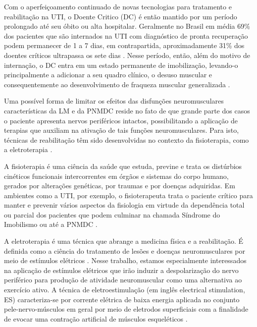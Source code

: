 Com o aperfeiçoamento continuado de novas tecnologias para tratamento e reabilitação na \acrshort{UTI}, o Doente Critico (\acrshort{DC}) é então mantido por um período prolongado até seu óbito ou alta hospitalar.  Geralmente no Brasil em média 69\% dos pacientes que são internados na \acrshort{UTI} com diagnóstico de pronta recuperação podem permanecer de 1 a 7 dias, em contrapartida, aproximadamente 31\% dos doentes críticos ultrapassa os sete dias \cite{Abelha2006FatoresAdultos}. Nesse período, então, além do motivo de internação, o \acrshort{DC} entra em um estado permanente de imobilização, levando-o principalmente a adicionar a seu quadro clínico, o desuso muscular e consequentemente ao desenvolvimento de fraqueza muscular generalizada \cite{Miranda2013EletroestimulacaoSistematica}. 

Uma possível forma de limitar os efeitos das disfunções neuromusculares características da \acrshort{LM} e da \acrshort{PNMDC} reside no fato de que grande parte dos casos o paciente apresenta nervos periféricos intactos, possibilitando a aplicação de terapias que auxiliam na ativação de tais funções neuromusculares. Para isto, técnicas de reabilitação têm sido desenvolvidas no contexto da fisioterapia, como a eletroterapia \cite{Grill2000NeuroprostheticStimulation, McDonald2002SpinalInjury}. 

A fisioterapia é uma ciência da saúde que estuda, previne e trata os distúrbios cinéticos funcionais intercorrentes em órgãos e sistemas do corpo humano, gerados por alterações genéticas, por traumas e por doenças adquiridas. Em ambientes como a \acrshort{UTI}, por exemplo, o fisioterapeuta trata o paciente crítico para manter e prevenir vários aspectos da fisiologia em virtude da dependência total ou parcial dos pacientes que podem culminar na chamada Síndrome do Imobilismo ou até a \acrshort{PNMDC} \cite{Franca2012FisioterapiaBrasileira}. 

A eletroterapia é uma técnica que abrange a medicina física e a reabilitação. É definida como a ciência do tratamento de lesões e doenças neuromusculares por meio de estímulos elétricos \cite{Crepon2008Electroterapia.Electroestimulacion}. Nesse trabalho, estamos especialmente interessados na aplicação de estímulos elétricos que irão induzir a despolarização do nervo periférico para produção de atividade neuromuscular como uma alternativa ao exercício ativo. A técnica de eletroestimulação (em inglês electrical stimulation, \acrshort{ES}) caracteriza-se por corrente elétrica de baixa energia aplicada no conjunto pele-nervo-músculos em geral por meio de eletrodos superficiais com a finalidade de evocar uma contração artificial de músculos esqueléticos \cite{Popovic2000ControlDisabled}.

